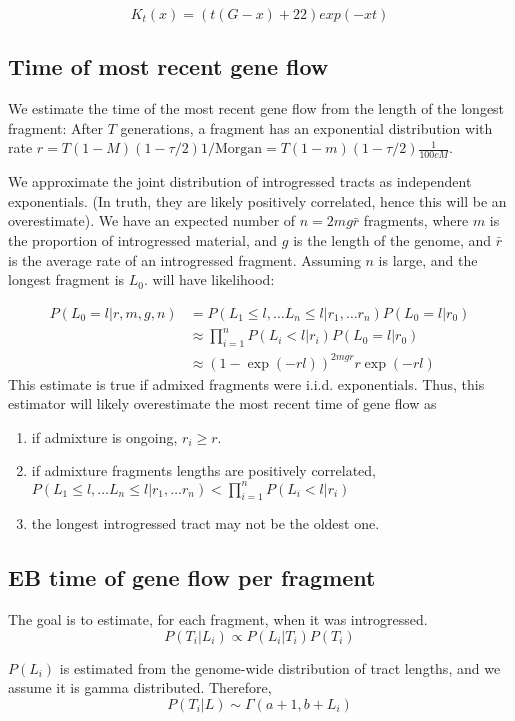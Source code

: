 \documentclass[10pt,a4paper]{article}
\begin{document}
$$K_t(x) = (t(G - x) +22) exp(-x t)$$


\subsection{Time of most recent gene flow}
We estimate the time of the most recent gene flow from the length of the longest fragment:
After $T$ generations, a fragment has an exponential distribution with rate $r=T(1-M)(1-\tau/2) 1/\text{Morgan} = T(1-m) (1-\tau/2)\frac{1}{100 cM}$.

We approximate the joint distribution of introgressed tracts as independent exponentials. (In truth, they are likely positively correlated, hence this will be an overestimate). We have an expected number of $n=2mg\bar{r}$ fragments, where $m$ is the proportion of introgressed material, and $g$ is the length of the genome, and $\bar{r}$ is the average rate of an introgressed fragment. Assuming $n$ is large, and the longest fragment is $L_0$. will have likelihood:  

\begin{align}
P(L_0=l | r, m, g, n) 
&= P(L_1 \leq l, \dots L_n \leq l | r_1, \dots r_n) P(L_0 = l | r_0)\nonumber\\
 &\approx \prod_{i=1}^n P(L_i < l| r_i) P(L_0 = l | r_0)\nonumber\\
&\approx (1- \exp( -r l ))^{2m g r} r \exp ( -r l)
\end{align}
This estimate is true if admixed fragments were i.i.d. exponentials. Thus, this estimator will likely overestimate the most recent time of gene flow as
\begin{enumerate}
	\item if admixture is ongoing, $r_i \geq r$.
	\item if admixture fragments lengths are positively correlated, $P(L_1 \leq l, \dots L_n \leq l | r_1, \dots r_n) < \prod_{i=1}^n P(L_i < l| r_i)$
	\item the longest introgressed tract may not be the oldest one.
\end{enumerate}

\subsection{EB time of gene flow per fragment}
The goal is to estimate, for each fragment, when it was introgressed.
$$P(T_i | L_i) \propto P(L_i | T_i) P(T_i) $$

$P(L_i)$ is estimated from the genome-wide distribution of tract lengths, and we assume it is gamma distributed. Therefore,
\begin{equation}
P(T_i | L) \sim \Gamma(a+1, b+L_i)
\end{equation}
\end{document}
